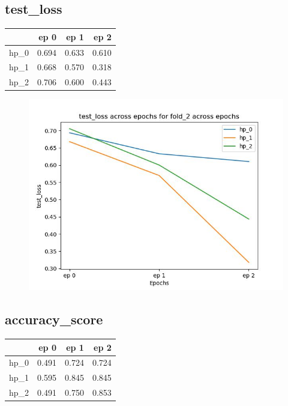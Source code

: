 \documentclass{article}
\begin{document}
\subsection{test\_loss}
\begin{tabular}{lrrr}
\toprule
{} &   ep 0 &   ep 1 &   ep 2 \\
\midrule
hp\_0 &  0.694 &  0.633 &  0.610 \\
hp\_1 &  0.668 &  0.570 &  0.318 \\
hp\_2 &  0.706 &  0.600 &  0.443 \\
\bottomrule
\end{tabular}

\begin{figure}[H]
\includegraphics[scale = 0.75]{fold_2/test_loss}
\end{figure}
\subsection{accuracy\_score}
\begin{tabular}{lrrr}
\toprule
{} &   ep 0 &   ep 1 &   ep 2 \\
\midrule
hp\_0 &  0.491 &  0.724 &  0.724 \\
hp\_1 &  0.595 &  0.845 &  0.845 \\
hp\_2 &  0.491 &  0.750 &  0.853 \\
\bottomrule
\end{tabular}
\end{document}
